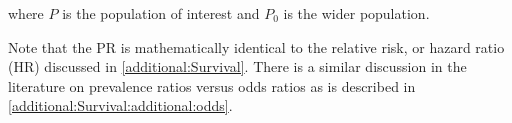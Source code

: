 \noindent where $P$ is the population of interest and $P_{0}$ is the wider population.

Note that the PR is mathematically identical to the relative risk, or hazard ratio (HR) discussed in \cref{additional:Survival}.
There is a similar discussion in the literature \cite{pmid27460748,10.3389/fvets.2017.00193}
on prevalence ratios versus odds ratios as is described in \cref{additional:Survival:additional:odds}.

